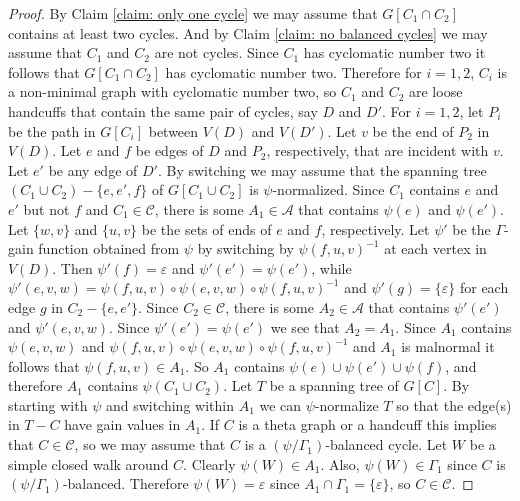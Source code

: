 \documentclass[10pt,a4paper]{amsart}
\newcommand{\cA}{\mathcal{A}}
\newcommand{\cC}{\mathcal{C}}
\newcommand{\ep}{\varepsilon}
\begin{document}
\begin{proof}
By Claim \ref{claim: only one cycle} we may assume that $G[C_1 \cap C_2]$ contains at least two cycles.
And by Claim \ref{claim: no balanced cycles} we may assume that $C_1$ and $C_2$ are not cycles.
Since $C_1$ has cyclomatic number two it follows that $G[C_1 \cap C_2]$ has cyclomatic number two.
Therefore for $i = 1,2$, $C_i$ is a non-minimal graph with cyclomatic number two, so $C_1$ and $C_2$ are loose handcuffs that contain the same pair of cycles, say $D$ and $D'$.
For $i = 1,2$, let $P_i$ be the path in $G[C_i]$ between $V(D)$ and $V(D')$.
Let $v$ be the end of $P_2$ in $V(D)$.
Let $e$ and $f$ be edges of $D$ and $P_2$, respectively, that are incident with $v$.
Let $e'$ be any edge of $D'$.
By switching we may assume that the spanning tree $(C_1 \cup C_2) - \{e, e', f\}$ of $G[C_1 \cup C_2]$ is $\psi$-normalized.
Since $C_1$ contains $e$ and $e'$ but not $f$ and $C_1 \in \cC$, there is some $A_1 \in \cA$ that contains $\psi(e)$ and $\psi(e')$.
Let $\{w,v\}$ and $\{u,v\}$ be the sets of ends of $e$ and $f$, respectively.
Let $\psi'$ be the $\Gamma$-gain function obtained from $\psi$ by switching by $\psi(f, u, v)^{-1}$ at each vertex in $V(D)$.
Then $\psi'(f) = \ep$ and $\psi'(e') = \psi(e')$, while $\psi'(e, v, w) = \psi(f, u, v) \circ \psi(e, v, w) \circ \psi(f, u, v)^{-1}$ and $\psi'(g) = \{\ep\}$ for each edge $g$ in $C_2 - \{e, e'\}$.
Since $C_2 \in \cC$, there is some $A_2 \in \cA$ that contains $\psi'(e')$ and $\psi'(e, v, w)$.
Since $\psi'(e') = \psi(e')$ we see that $A_2 = A_1$.
Since $A_1$ contains $\psi(e, v, w)$ and $\psi(f, u, v) \circ \psi(e, v, w) \circ \psi(f, u, v)^{-1}$ and $A_1$ is malnormal it follows that $\psi(f, u, v) \in A_1$.
So $A_1$ contains $\psi(e) \cup \psi(e') \cup \psi(f)$, and therefore $A_1$ contains $\psi(C_1 \cup C_2)$.
Let $T$ be a spanning tree of $G[C]$.
By starting with $\psi$ and switching within $A_1$ we can $\psi$-normalize $T$ so that the edge(s) in $T - C$ have gain values in $A_1$.
If $C$ is a theta graph or a handcuff this implies that $C \in \cC$, so we may assume that $C$ is a $(\psi/\Gamma_1)$-balanced cycle.
Let $W$ be a simple closed walk around $C$.
Clearly $\psi(W) \in A_1$.
Also, $\psi(W) \in \Gamma_1$ since $C$ is $(\psi/\Gamma_1)$-balanced.
Therefore $\psi(W) = \ep$ since $A_1 \cap \Gamma_1 = \{\ep\}$, so $C \in \cC$.
\end{proof}
\end{document}
